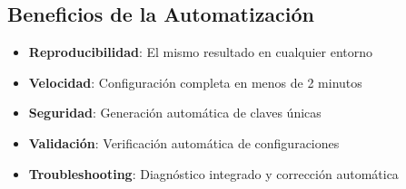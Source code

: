 \subsection{Beneficios de la Automatización}

\begin{destacado}
\begin{itemize}
    \item \textbf{Reproducibilidad}: El mismo resultado en cualquier entorno
    \item \textbf{Velocidad}: Configuración completa en menos de 2 minutos
    \item \textbf{Seguridad}: Generación automática de claves únicas
    \item \textbf{Validación}: Verificación automática de configuraciones
    \item \textbf{Troubleshooting}: Diagnóstico integrado y corrección automática
\end{itemize}
\end{destacado}
